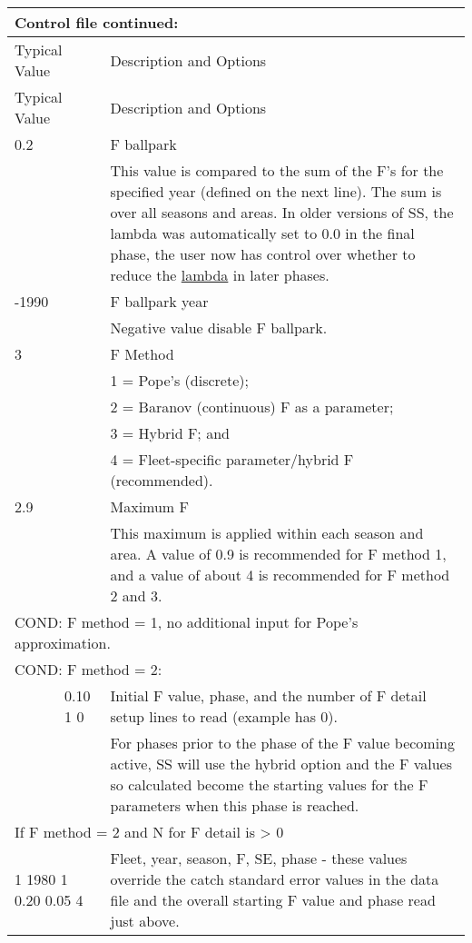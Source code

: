 \begin{longtable}{p{1cm} p{3cm} p{11cm}}
	\multicolumn{3}{l}{Control file continued:}\\
	\hline
	\multicolumn{2}{l}{Typical Value} & Description and Options\Tstrut\Bstrut\\
	\hline
	\endfirsthead

	\hline
	\multicolumn{2}{l}{Typical Value} & Description and Options\Tstrut\Bstrut\\
	\hline
	\endhead

	\hline
	\endfoot
	\endlastfoot

	0.2 \Tstrut & & F ballpark\\
	    & & This value is compared to the sum of the F's for the specified year (defined on the next line). The sum is over all seasons and areas. In older versions of SS, the lambda was automatically set to 0.0 in the final phase, the user now has control over whether to reduce the \hyperlink{Lambdas}{lambda} in later phases.\Bstrut\\
   \hline

	-1990\Tstrut & & F ballpark year\\
	      & & Negative value disable F ballpark.\Bstrut\\
   \hline

	3 \Tstrut & & F Method \\
	   & & 1 = Pope's (discrete); \\
	   & & 2 = Baranov (continuous) F as a parameter; \\
	   & & 3 = Hybrid F; and \\
	   & & 4 = Fleet-specific parameter/hybrid F (recommended).\Bstrut\\
   \hline

   2.9 \Tstrut & & Maximum F \\
       & & This maximum is applied within each season and area.   A value of 0.9 is recommended for F method 1, and a value of about 4 is recommended for F method 2 and 3. \Bstrut\\
   \hline

   \multicolumn{3}{l}{COND: F method = 1, no additional input for Pope's approximation.}\Tstrut\Bstrut\\
   \hline

   \multicolumn{3}{l}{COND: F method = 2: }\Tstrut\\
   & 0.10  1  0 & Initial F value, phase, and the number of F detail setup lines to read (example has 0). \\
   &  & For phases prior to the phase of the F value becoming active,  SS will use the hybrid option and the F values so calculated become the starting values for the F parameters when this phase is reached.\\		   
   \multicolumn{3}{l}{If F method = 2 and N for F detail is > 0}\Tstrut\\
   \multicolumn{2}{l}{1 1980 1 0.20 0.05 4} & Fleet, year, season, F, SE, phase - these values override the catch standard error values in the data file and the overall starting F value and phase read just above.\Bstrut\\
   \hline


\end{longtable}
